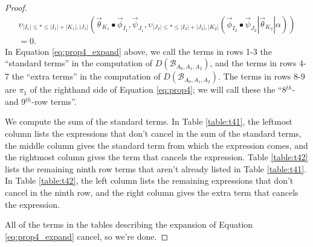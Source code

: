 \begin{proof}
\begin{equation}
\begin{aligned}
\upsilon_{|I_1| \leq * \leq |I_1| + |K_1|,|J_1|}(\vec{\theta}_{K_1} \bullet \vec{\phi}_{I_1}, \vec{\psi}_{J_1}, 
    \upsilon_{|J_2| \leq * \leq |I_2| + |J_2|,|K_2|}(\vec{\phi}_{I_2} \bullet \vec{\psi}_{J_2} | \vec{\theta}_{K_2} | \alpha )) \\
%
=0.
\end{aligned}
\end{equation}
In Equation \ref{eq:prop4_expand} above, 
we call the terms in rows 1-3 the 
``standard terms'' in the computation of 
$D(\mathcal{B}_{A_0,A_1,A_2})$, and the terms in rows 
4-7 the ``extra terms'' in the computation 
of $D(\mathcal{B}_{A_0,A_1,A_2})$. The terms in rows 8-9 
are $\pi_1$ of the righthand side of Equation 
\ref{eq:prop4}; we will call these the 
``8$^{th}$- and 9$^{th}$-row terms''.

We compute the sum of the standard terms. 
In Table \ref{table:t41}, the leftmost column lists 
the expressions that don't cancel in the sum 
of the standard terms, the middle column gives 
the standard term from which the expression comes, 
and the rightmost column gives the term that 
cancels the expression. Table \ref{table:t42} 
lists the remaining ninth row terms that aren't 
already listed in Table \ref{table:t41}. In 
Table \ref{table:t42}, the left column lists 
the remaining expressions that don't cancel in 
the ninth row, and the right column gives 
the extra term that cancels the expression. 

All of the terms in the tables describing 
the expansion of Equation \ref{eq:prop4_expand} 
cancel, so we're done.
\end{proof}
%
